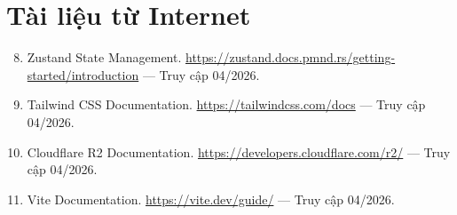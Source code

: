 \documentclass[12pt,a4paper]{report}
\begin{document}
\section*{Tài liệu từ Internet}

\begin{enumerate}
    \setcounter{enumi}{7}
    \item Zustand State Management. \url{https://zustand.docs.pmnd.rs/getting-started/introduction} --- Truy cập 04/2026.
    \item Tailwind CSS Documentation. \url{https://tailwindcss.com/docs} --- Truy cập 04/2026.
    \item Cloudflare R2 Documentation. \url{https://developers.cloudflare.com/r2/} --- Truy cập 04/2026.
    \item Vite Documentation. \url{https://vite.dev/guide/} --- Truy cập 04/2026.
\end{enumerate}
\end{document}
